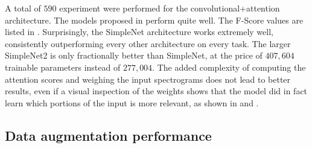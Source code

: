
A total of $590$ experiment were performed for the convolutional+attention
architecture.
%
The models proposed in  perform quite well.
%
The F-Score values are listed in .
%
Surprisingly, the SimpleNet architecture works extremely well, consistently
outperforming every other architecture on every task. The larger SimpleNet2 is
only fractionally better than SimpleNet, at the price of $407,604$ trainable
parameters instead of $277,004$.
%
The added complexity of computing the attention scores and weighing the input
spectrograms does not lead to better results, even if a visual inspection of
the weights shows that the model did in fact learn which portions of the input
is more relevant, as shown in  and
.

\subsection{Data augmentation performance}
\label{sec:augmentation_performance}


